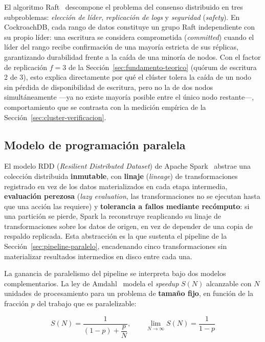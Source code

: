 El algoritmo Raft~\cite{ongaro2014raft} descompone el problema del consenso distribuido en tres
subproblemas: \emph{elección de líder}, \emph{replicación de logs} y \emph{seguridad}
(\emph{safety}). En CockroachDB, cada rango de datos constituye un grupo Raft independiente con su
propio líder: una escritura se considera comprometida (\emph{committed}) cuando el líder del rango
recibe confirmación de una mayoría estricta de sus réplicas, garantizando durabilidad frente a la
caída de una minoría de nodos. Con el factor de replicación $f=3$ de la
Sección~\ref{sec:fundamento-teorico} (quórum de escritura 2 de 3), esto explica directamente por
qué el clúster tolera la caída de un nodo sin pérdida de disponibilidad de escritura, pero no la
de dos nodos simultáneamente —ya no existe mayoría posible entre el único nodo restante—,
comportamiento que se contrasta con la medición empírica de la
Sección~\ref{sec:cluster-verificacion}.

\subsection{Modelo de programación paralela}
\label{sec:fundamento-modelo-paralelo}

El modelo RDD (\emph{Resilient Distributed Dataset}) de Apache Spark~\cite{zaharia2012rdd} abstrae
una colección distribuida \textbf{inmutable}, con \textbf{linaje} (\emph{lineage}) de
transformaciones registrado en vez de los datos materializados en cada etapa intermedia,
\textbf{evaluación perezosa} (\emph{lazy evaluation}, las transformaciones no se ejecutan hasta que
una acción las requiere) y \textbf{tolerancia a fallos mediante recómputo}: si una partición se
pierde, Spark la reconstruye reaplicando su linaje de transformaciones sobre los datos de origen,
en vez de depender de una copia de respaldo replicada. Esta abstracción es la que sustenta el
pipeline de la Sección~\ref{sec:pipeline-paralelo}, encadenando cinco transformaciones sin
materializar resultados intermedios en disco entre cada una.

La ganancia de paralelismo del pipeline se interpreta bajo dos modelos complementarios. La ley de
Amdahl~\cite{amdahl1967validity} modela el \emph{speedup} $S(N)$ alcanzable con $N$ unidades de
procesamiento para un problema de \textbf{tamaño fijo}, en función de la fracción $p$ del trabajo
que es paralelizable:

\begin{equation}
    S(N) = \frac{1}{(1-p) + \dfrac{p}{N}}, \qquad \lim_{N \to \infty} S(N) = \frac{1}{1-p}
    \label{eq:amdahl}
\end{equation}

